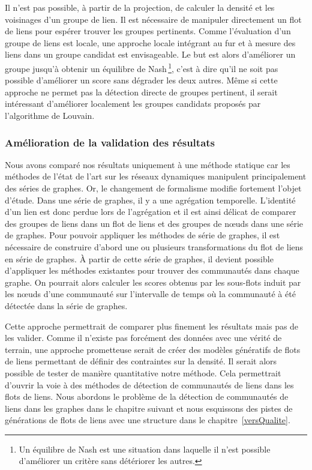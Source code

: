 Il n'est pas possible, à partir de la projection, de calculer la densité et les voisinages d'un groupe de lien.
Il est nécessaire de manipuler directement un flot de liens pour espérer trouver les groupes pertinents.
Comme l'évaluation d'un groupe de liens est locale, une approche locale intégrant au fur et à mesure des liens dans un groupe candidat est envisageable.
Le but est alors d'améliorer un groupe jusqu'à obtenir un équilibre de Nash\,\footnote{Un équilibre de Nash est une situation dans laquelle il n'est possible d'améliorer un critère sans détériorer les autres.}, c'est à dire qu'il ne soit pas possible d'améliorer un score sans dégrader les deux autres.
Même si cette approche ne permet pas la détection directe de groupes pertinent, il serait intéressant d'améliorer localement les groupes candidats proposés par l'algorithme de Louvain.


\subsubsection{Amélioration de la validation des résultats}

Nous avons comparé nos résultats uniquement à une méthode statique car les méthodes de l'état de l'art sur les réseaux dynamiques manipulent principalement des séries de graphes.
Or, le changement de formalisme modifie fortement l'objet d'étude.
Dans une série de graphes, il y a une agrégation temporelle.
L'identité d'un lien est donc perdue lors de l'agrégation et il est ainsi délicat de comparer des groupes de liens dans un flot de liens et des groupes de n\oe{}uds dans une série de graphes.
Pour pouvoir appliquer les méthodes de série de graphes, il est nécessaire de construire d'abord une ou plusieurs transformations du flot de liens en série de graphes.
\`A partir de cette série de graphes, il devient possible d'appliquer les méthodes existantes pour trouver des communautés dans chaque graphe.
On pourrait alors calculer les scores obtenus par les sous-flots induit par les n\oe{}uds d'une communauté sur l'intervalle de temps où la communauté à été détectée dans la série de graphes.


Cette approche permettrait de comparer plus finement les résultats mais pas de les valider.
Comme il n'existe pas forcément des données avec une vérité de terrain, une approche prometteuse serait de créer des modèles génératifs de flots de liens permettant de définir des contraintes sur la densité.
Il serait alors possible de tester de manière quantitative notre méthode.
Cela permettrait d'ouvrir la voie à des méthodes de détection de communautés de liens dans les flots de liens.
Nous abordons le problème de la détection de communautés de liens dans les graphes dans le chapitre suivant et nous esquissons des pistes de générations de flots de liens avec une structure dans le chapitre~\ref{versQualite}.